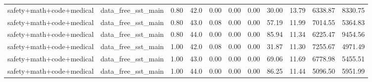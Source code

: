 \begin{table}[H]
{\begin{tabular}{llllrrrrrrr}
safety+math+code+medical & data\_free\_sst\_main & 0.80 & 42.0 & 0.00 & 0.00 & 0.00 & 30.00 & 13.79 & 6338.87 & 8330.75 \\
safety+math+code+medical & data\_free\_sst\_main & 0.80 & 43.0 & 0.08 & 0.00 & 0.00 & 57.19 & 11.99 & 7014.55 & 5364.83 \\
safety+math+code+medical & data\_free\_sst\_main & 0.80 & 44.0 & 0.00 & 0.00 & 0.00 & 85.94 & 11.34 & 6225.47 & 9454.56 \\
safety+math+code+medical & data\_free\_sst\_main & 1.00 & 42.0 & 0.08 & 0.00 & 0.00 & 31.87 & 11.30 & 7255.67 & 4971.49 \\
safety+math+code+medical & data\_free\_sst\_main & 1.00 & 43.0 & 0.00 & 0.00 & 0.00 & 69.06 & 11.69 & 6778.98 & 5455.51 \\
safety+math+code+medical & data\_free\_sst\_main & 1.00 & 44.0 & 0.00 & 0.00 & 0.00 & 86.25 & 11.44 & 5096.50 & 5951.99 \\
\bottomrule
\end{tabular}
}
\end{table}
